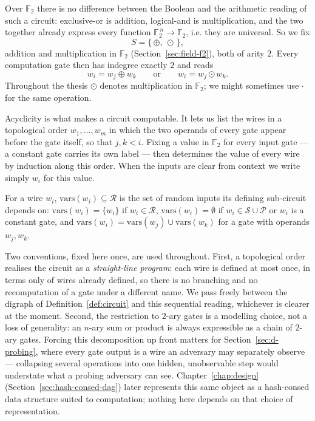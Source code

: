 Over $\mathbb{F}_2$ there is no difference between the Boolean and the arithmetic
reading of such a circuit: exclusive-or is addition, logical-and is
multiplication, and the two together already express every function
$\mathbb{F}_2^{\,n} \to \mathbb{F}_2$, i.e. they are universal. So we fix
\[
  S = \{\,\oplus,\ \odot\,\},
\]
addition and multiplication in $\mathbb{F}_2$ (Section~\ref{sec:field-f2}), both
of arity $2$. Every computation gate then has indegree exactly $2$ and reads
\[
  w_i = w_j \oplus w_k \qquad \text{or} \qquad w_i = w_j \odot w_k .
\]
Throughout the thesis $\odot$ denotes multiplication in $\mathbb{F}_2$; we
might sometimes use $\cdot$ for the same operation.

Acyclicity is what makes a circuit computable. It lets us list the wires in a
topological order $w_1, \dots, w_m$ in which the two operands of every gate
appear before the gate itself, so that $j, k < i$. Fixing a value in
$\mathbb{F}_2$ for every input gate --- a constant gate carries its own label
--- then determines the value of every wire by induction along this order. When
the inputs are clear from context we write simply $w_i$ for this value.

\begin{notation}
For a wire $w_i$, $\mathrm{vars}(w_i) \subseteq \mathcal{R}$ is the set of
random inputs its defining sub-circuit depends on: $\mathrm{vars}(w_i) = \{w_i\}$
if $w_i \in \mathcal{R}$, $\mathrm{vars}(w_i) = \emptyset$ if
$w_i \in \mathcal{S} \cup \mathcal{P}$ or $w_i$ is a constant gate, and
$\mathrm{vars}(w_i) = \mathrm{vars}(w_j) \cup \mathrm{vars}(w_k)$ for a gate
with operands $w_j, w_k$.
\end{notation}

Two conventions, fixed here once, are used throughout. First, a topological
order realises the circuit as a \emph{straight-line program}: each wire is
defined at most once, in terms only of wires already defined, so there is no
branching and no recomputation of a gate under a different name. We pass freely
between the digraph of Definition~\ref{def:circuit} and this sequential reading,
whichever is clearer at the moment. Second, the restriction to $2$-ary gates is
a modelling choice, not a loss of generality: an $n$-ary sum or product is
always expressible as a chain of $2$-ary gates. Forcing this decomposition up
front matters for Section~\ref{sec:d-probing}, where every gate output is a wire
an adversary may separately observe --- collapsing several operations into one
hidden, unobservable step would understate what a probing adversary can see.
Chapter~\ref{chap:design} (Section~\ref{sec:hash-consed-dag}) later represents
this same object as a hash-consed data structure suited to computation; nothing
here depends on that choice of representation.

